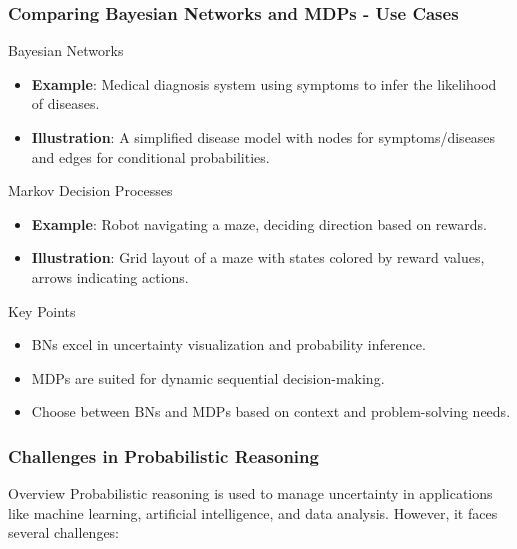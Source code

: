 \documentclass[aspectratio=169]{beamer}
\begin{document}
\begin{frame}[fragile]
    \frametitle{Comparing Bayesian Networks and MDPs - Use Cases}
    \begin{block}{Bayesian Networks}
        \begin{itemize}
            \item \textbf{Example}: Medical diagnosis system using symptoms to infer the likelihood of diseases.
            \item \textbf{Illustration}: A simplified disease model with nodes for symptoms/diseases and edges for conditional probabilities.
        \end{itemize}
    \end{block}
    
    \begin{block}{Markov Decision Processes}
        \begin{itemize}
            \item \textbf{Example}: Robot navigating a maze, deciding direction based on rewards.
            \item \textbf{Illustration}: Grid layout of a maze with states colored by reward values, arrows indicating actions.
        \end{itemize}
    \end{block}
    
    \begin{block}{Key Points}
        \begin{itemize}
            \item BNs excel in uncertainty visualization and probability inference.
            \item MDPs are suited for dynamic sequential decision-making.
            \item Choose between BNs and MDPs based on context and problem-solving needs.
        \end{itemize}
    \end{block}
\end{frame}

\begin{frame}[fragile]
    \frametitle{Challenges in Probabilistic Reasoning}
    \begin{block}{Overview}
        Probabilistic reasoning is used to manage uncertainty in applications like machine learning, artificial intelligence, and data analysis. However, it faces several challenges:
    \end{block}
\end{frame}
\end{document}
